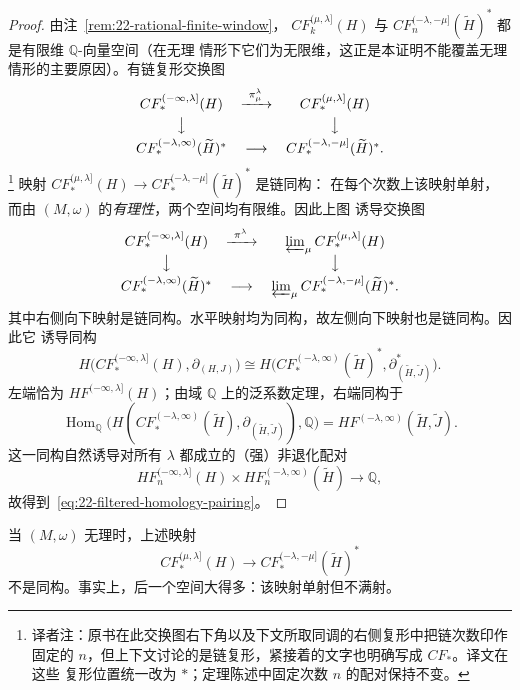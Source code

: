 \begin{proof}
由注~\ref{rem:22-rational-finite-window}，
$CF_k^{(\mu,\lambda]}(H)$ 与
$CF_n^{(-\lambda,-\mu]}(\widetilde H)^*$ 都是有限维 $\mathbb Q$-向量空间（在无理
情形下它们为无限维，这正是本证明不能覆盖无理情形的主要原因）。有链复形交换图
\begin{equation}
\begin{array}{ccc}
 CF_*^{(-\infty,\lambda]}(H)&\xrightarrow{\ \pi_\mu^\lambda\ }&
 CF_*^{(\mu,\lambda]}(H)\\[3pt]
 \big\downarrow&&\big\downarrow\\[3pt]
 CF_*^{(-\lambda,\infty)}(\widetilde H)^*&\longrightarrow&
 CF_*^{(-\lambda,-\mu]}(\widetilde H)^* .
\end{array}
 \label{eq:22-filtered-chain-diagram}
\end{equation}
\footnote{译者注：原书在此交换图右下角以及下文所取同调的右侧复形中把链次数印作
固定的 $n$，但上下文讨论的是链复形，紧接着的文字也明确写成 $CF_*$。译文在这些
复形位置统一改为 $*$；定理陈述中固定次数 $n$ 的配对保持不变。}
映射
$CF_*^{(\mu,\lambda]}(H)\to CF_*^{(-\lambda,-\mu]}(\widetilde H)^*$ 是链同构：
在每个次数上该映射单射，而由 $(M,\omega)$ 的\emph{有理性}，两个空间均有限维。因此上图
诱导交换图
\[
\begin{array}{ccc}
 CF_*^{(-\infty,\lambda]}(H)&\xrightarrow{\ \pi^\lambda\ }&
 \varprojlim_\mu CF_*^{(\mu,\lambda]}(H)\\[3pt]
 \big\downarrow&&\big\downarrow\\[3pt]
 CF_*^{(-\lambda,\infty)}(\widetilde H)^*&\longrightarrow&
 \varprojlim_\mu CF_*^{(-\lambda,-\mu]}(\widetilde H)^* .
\end{array}
\]
其中右侧向下映射是链同构。水平映射均为同构，故左侧向下映射也是链同构。因此它
诱导同构
\[
 H\bigl(CF_*^{(-\infty,\lambda]}(H),\partial_{(H,J)}\bigr)
 \cong
 H\bigl(CF_*^{(-\lambda,\infty)}(\widetilde H)^*,
 \partial_{(\widetilde H,\widetilde J)}^*\bigr).
\]
左端恰为 $HF^{(-\infty,\lambda]}(H)$；由域 $\mathbb Q$ 上的泛系数定理，右端同构于
\[
 \operatorname{Hom}_{\mathbb Q}
 \bigl(H(CF_*^{(-\lambda,\infty)}(\widetilde H),
 \partial_{(\widetilde H,\widetilde J)}),\mathbb Q\bigr)
 =HF^{(-\lambda,\infty)}(\widetilde H,\widetilde J).
\]
这一同构自然诱导对所有 $\lambda$ 都成立的（强）非退化配对
\[
 HF_n^{(-\infty,\lambda]}(H)\times
 HF_n^{(-\lambda,\infty)}(\widetilde H)\longrightarrow\mathbb Q,
\]
故得到~\eqref{eq:22-filtered-homology-pairing}。
\end{proof}

当 $(M,\omega)$ 无理时，上述映射
\[
 CF_*^{(\mu,\lambda]}(H)\longrightarrow
 CF_*^{(-\lambda,-\mu]}(\widetilde H)^*
\]
不是同构。事实上，后一个空间大得多：该映射单射但不满射。


